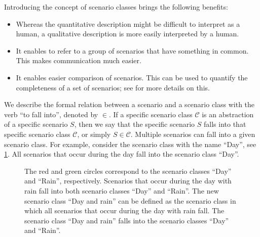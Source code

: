 Introducing the concept of scenario classes brings the following benefits:
\begin{itemize}
	\item Whereas the quantitative description might be difficult to interpret as a human, a qualitative description is more easily interpreted by a human.
	\item It enables to refer to a group of scenarios that have something in common. This makes communication much easier.
	\item It enables easier comparison of scenarios. This can be used to quantify the completeness of a set of scenarios; see \cite{degelder2019completeness} for more details on this.
\end{itemize}

\cbstart
We describe the formal relation between a scenario and a scenario class with the verb ``to fall into'', denoted by $\in$. If a specific scenario class $\mathcal{C}$ is an abstraction of a specific scenario $S$, then we say that the specific scenario $S$ falls into that specific scenario class $\mathcal{C}$, or simply $S \in \mathcal{C}$\cbend. Multiple scenarios can fall into a given scenario class. For example, consider the scenario class with the name ``Day'', see \cref{fig:venn diagram scenario class}. All scenarios that occur during the day fall into the scenario class ``Day''.

\setlength{\venncircle}{7em}
\begin{figure}
	\centering
	\caption{The red and green circles correspond to the scenario classes ``Day'' and ``Rain'', respectively. Scenarios that occur during the day with rain fall into both scenario classes ``Day'' and ``Rain''. The new scenario class ``Day and rain'' can be defined as the scenario class in which all scenarios that occur during the day with rain fall. The scenario class ``Day and rain'' falls into the scenario classes ``Day'' and ``Rain''.}
	\label{fig:venn diagram scenario class}
\end{figure}

